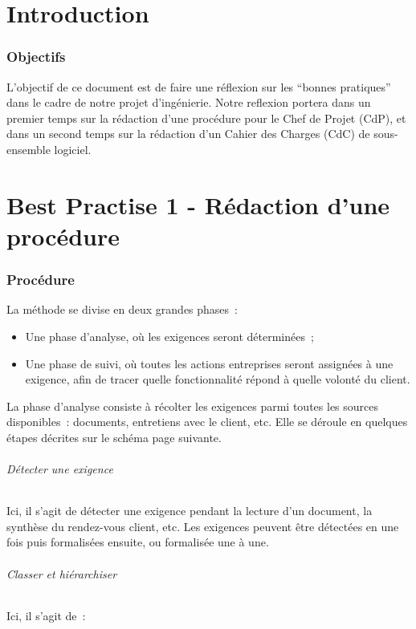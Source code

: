 
\part{Introduction}

\section{Objectifs}

L'objectif de ce document est de faire une réflexion sur les ``bonnes pratiques'' dans le cadre de notre projet
d'ingénierie. Notre reflexion portera dans un premier temps sur la rédaction d'une procédure pour le Chef de Projet (CdP),
et dans un second temps sur la rédaction d'un Cahier des Charges (CdC) de sous-ensemble logiciel.

\part{Best Practise 1 - Rédaction d'une procédure}

\section{Procédure}

La méthode se divise en deux grandes phases :

\begin{itemize}
\item Une phase d’analyse, où les exigences seront déterminées ;
\item Une phase de suivi, où toutes les actions entreprises seront assignées à une exigence, afin de tracer quelle fonctionnalité répond à quelle volonté du client.
\end{itemize}

La phase d’analyse consiste à récolter les exigences parmi toutes les sources disponibles : documents, entretiens avec le client, etc. Elle se déroule en quelques étapes décrites sur le schéma page suivante.

\paragraph{Détecter une exigence}
Ici, il s’agit de détecter une exigence pendant la lecture d’un document, la synthèse du rendez-vous client, etc. Les exigences peuvent être détectées en une fois puis formalisées ensuite, ou formalisée une à une.

\paragraph{Classer et hiérarchiser}
Ici, il s’agit de :

